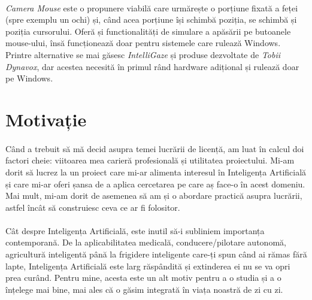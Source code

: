 \paragraph{}
\emph{Camera Mouse} este o propunere viabilă care urmărește o porțiune fixată a feței (spre exemplu un ochi) și, când acea porțiune își schimbă poziția, se schimbă și poziția cursorului.
Oferă și functionalități de simulare a apăsării pe butoanele mouse-ului, însă funcționează doar pentru sistemele care rulează Windows.
Printre alternative se mai găsesc \emph{IntelliGaze} și produse dezvoltate de \emph{Tobii Dynavox}, dar acestea necesită în primul rând hardware adițional și rulează doar pe Windows.

\section*{Motivație}
\paragraph{}
Când a trebuit să mă decid asupra temei lucrării de licență, am luat în calcul doi factori cheie: viitoarea mea carieră profesională și utilitatea proiectului.
Mi-am dorit să lucrez la un proiect care mi-ar alimenta interesul în Inteligența Artificială și care mi-ar oferi șansa de a aplica cercetarea pe care aș face-o în acest domeniu.
Mai mult, mi-am dorit de asemenea să am și o abordare practică asupra lucrării, astfel încât să construiesc ceva ce ar fi folositor.

\paragraph{}
Cât despre Inteligența Artificială, este inutil să-i subliniem importanța contemporană.
De la aplicabilitatea medicală, conducere/pilotare autonomă, agricultură inteligentă până la frigidere inteligente care-ți spun când ai rămas fără lapte, Inteligența Artificială este larg răspândită și extinderea ei nu se va opri prea curând.
Pentru mine, acesta este un alt motiv pentru a o studia și a o înțelege mai bine, mai ales că o găsim integrată în viața noastră de zi cu zi.


